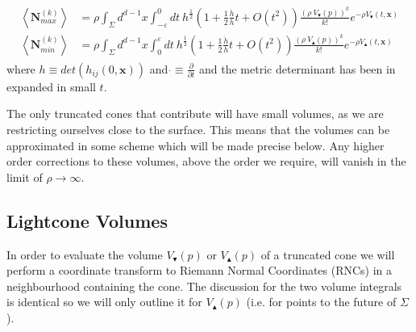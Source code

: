 \documentclass[12pt]{article}
\newcommand{\mb}[1]{\marginnote{\texttt{\small MB:\,#1}}}
\begin{document}
\begin{gather}\label{eq:nmax_and_eq:nmin}
\begin{aligned}
\left\langle \textbf{N}_{max}^{ (k)}\right\rangle & =\rho \int_{\Sigma}d^{d-1}x\int_{-\varepsilon}^{0}dt\:
h^{\frac{1}{2}}\left (1+
\frac{1}{2}\frac{\dot{h}}{h}t+O (t^2)\right)
 \frac{\left (\rho\: V_\blacktriangledown (p)\right)^k}{k!} e^{-\rho V_\blacktriangledown (t,\mathbf x)}
\\
\left\langle \textbf{N}_{min}^{ (k)}\right\rangle & =\rho \int_{\Sigma}d^{d-1}x\int_{0}^{\varepsilon}dt\:
h^{\frac{1}{2}}\left (1+
\frac{1}{2}\frac{\dot{h}}{h}t+O (t^2)\right) \frac{\left (\rho\: V_\blacktriangle (p)\right)^k}{k!} e^{-\rho V_\blacktriangle (t,\mathbf x)}
\end{aligned}
\end{gather}
where $h\equiv det\left (h_{ij} (0,\mathbf{x})\right)$ and $\dot{}\equiv \frac{\partial}{\partial t}$ and the metric determinant has been in expanded in small $t$.

The only truncated cones that contribute will have small volumes, as we are restricting ourselves close to the surface.
This means that the volumes can be approximated in some scheme which will be made precise below. Any higher order corrections to these volumes, above the order we require, will vanish in the limit of $\rho\rightarrow\infty$.

\subsection{Lightcone Volumes}

In order to evaluate the volume $V_\blacktriangledown (p)$ or $V_\blacktriangle (p)$ of a truncated cone we will perform a coordinate transform to Riemann Normal Coordinates (RNCs) in a neighbourhood containing the cone. The discussion for the two volume integrals is identical so we will only outline it for $V_\blacktriangle (p)$ (i.e. for points to the future of $\Sigma$). 
\end{document}
